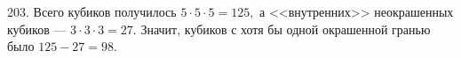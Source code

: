 203. Всего кубиков получилось $5\cdot5\cdot5=125,$ а <<внутренних>> неокрашенных кубиков --- $3\cdot3\cdot3=27.$ Значит, кубиков с хотя бы одной окрашенной гранью было $125-27=98.$\\
